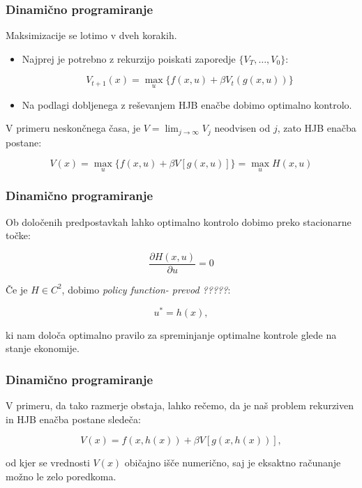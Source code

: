 \documentclass{beamer}
\begin{document}
\begin{frame}
\frametitle{Dinamično programiranje}

Maksimizacije se lotimo v dveh korakih.

\begin{itemize}
\item Najprej je potrebno z rekurzijo poiskati zaporedje $\{V_T, \ldots, V_0\}$:

\begin{equation}
V_{t+1}(x) = \max_u \{f(x,u) + \beta V_t(g(x,u))\}
\end{equation} 

\item Na podlagi dobljenega z reševanjem HJB enačbe dobimo optimalno kontrolo.

\end{itemize}

V primeru neskončnega časa, je $V = \lim_{j\to\infty}V_j$ neodvisen od $j$, zato HJB enačba postane:

\begin{equation}
V(x) = \max_u \{f(x,u) + \beta V[g(x,u)]\} = \max_u H(x,u)
\end{equation}

\end{frame}

\begin{frame}
\frametitle{Dinamično programiranje}

Ob določenih predpostavkah lahko optimalno kontrolo dobimo preko stacionarne točke:

\begin{equation}
\frac{\partial H(x,u)}{\partial u} = 0
\end{equation}

Če je $H \in C^2$, dobimo \textit{policy function- prevod ?????}:

\begin{equation}
u^* = h(x),
\end{equation}

ki nam določa optimalno pravilo za spreminjanje optimalne kontrole glede na stanje ekonomije. \newline

\end{frame}

\begin{frame}
\frametitle{Dinamično programiranje}

V primeru, da tako razmerje obstaja, lahko rečemo, da je naš problem rekurziven in HJB enačba postane sledeča:

\begin{equation}
V(x) = f(x,h(x)) + \beta V[g(x,h(x))], 
\end{equation} \newline


od kjer se vrednosti $V(x)$ običajno išče numerično, saj je eksaktno računanje možno le zelo poredkoma.


\end{frame}
\end{document}

